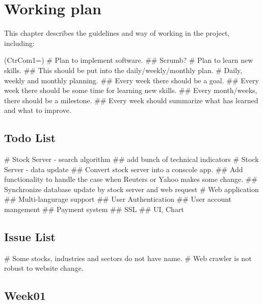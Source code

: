 \chapter{Working plan}
\label{chap:plan}

This chapter describes the guidelines and way of working in the project, including:
\begin{listb}
\ListProperties(CtrCom1=\counter{})
# Plan to implement software. 
  ## Scrumb? 
# Plan to learn new skills.
  ## This should be put into the daily/weekly/monthly plan.
# Daily, weekly and monthly planning. 
  ## Every week there should be a goal. 
  ## Every week there should be some time for learning new skills.
  ## Every month/weeks, there should be a milestone.
  ## Every week should summarize what has learned and what to improve.    
\end{listb}

\section{Todo List}

\begin{listb}
# Stock Server - search algorithm
  ## add bunch of technical indicators
# Stock Server - data update
  ## Convert stock server into a conscole app.
  ## Add functionality to handle the case when Reuters or Yahoo makes some change. 
  ## Synchronize database update by stock server and web request
# Web application
  ## Multi-langurage support
  ## User Authentication
  ## User account mangement
  ## Payment system
  ## SSL
  ## UI, Chart
\end{listb} 


\section{Issue List}

\begin{listb}
# Some stocks, industries and sectors do not have name.
# Web crawler is not robust to website change.
\end{listb} 



\newpage
\section*{Week01}


